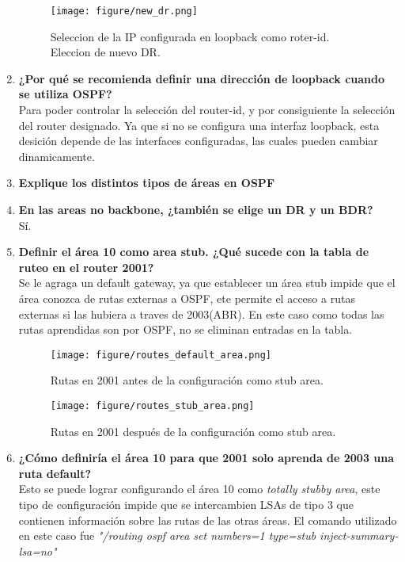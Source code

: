 \documentclass[letterpaper,12pt]{article}
\begin{document}
\begin{enumerate}
\begin{figure}[H]
			\centering \texttt{[image: figure/new\_dr.png]}
			\caption{
					\label{fig:samplesetup} %
					Seleccion de la IP configurada en loopback como roter-id. Eleccion de nuevo DR.
			}
		\end{figure}
		\item \textbf{¿Por qué se recomienda definir una dirección de loopback cuando se
		utiliza OSPF?}\\
		Para poder controlar la selección del router-id, y por consiguiente la selección del router designado. Ya que si no se configura una interfaz loopback, esta desición depende de las interfaces configuradas, las cuales pueden cambiar dinamicamente.
		\item \textbf{Explique los distintos tipos de áreas en OSPF}\\
		\item \textbf{En las areas no backbone, ¿también se elige un DR y un BDR?}\\
		Sí.
		\item \textbf{Definir el área 10 como area stub. ¿Qué sucede con la tabla de ruteo
		en el router 2001?}\\
		Se le agraga un default gateway, ya que establecer un área stub impide que el área conozca de rutas externas a OSPF, ete permite el acceso a rutas externas si las hubiera a traves de 2003(ABR). En este caso como todas las rutas aprendidas son por OSPF, no se eliminan entradas en la tabla.
		\begin{figure}[H] 
			
			\centering \texttt{[image: figure/routes\_default\_area.png]}
			\caption{
					\label{fig:samplesetup} %
					Rutas en 2001 antes de la configuración como stub area.
			}
		\end{figure} 
		\begin{figure}[H] 
			
			\centering \texttt{[image: figure/routes\_stub\_area.png]}
			\caption{
					\label{fig:samplesetup} %
					Rutas en 2001 después de la configuración como stub area.
			}
		\end{figure}
		\item \textbf{¿Cómo definiría el área 10 para que 2001 solo aprenda de 2003 una
		ruta default?}\\
		Esto se puede lograr configurando el área 10 como \textit{totally stubby area}, este tipo de configuración impide que se intercambien LSAs de tipo 3 que contienen información sobre las rutas de las otras áreas. El comando utilizado en este caso fue \textit{"/routing ospf area set numbers=1 type=stub inject-summary-lsa=no"}
		\begin{figure}[H] 
			

\end{figure}
\end{enumerate}
\end{document}
